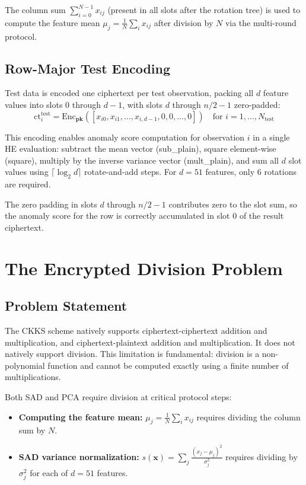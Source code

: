 The column sum $\sum_{i=0}^{N-1} x_{ij}$ (present in all slots after the
rotation tree) is used to compute the feature mean $\mu_j = \frac{1}{N}
\sum_i x_{ij}$ after division by $N$ via the multi-round protocol.

\subsection{Row-Major Test Encoding}

Test data is encoded one ciphertext per test observation, packing all $d$
feature values into slots $0$ through $d-1$, with slots $d$ through $n/2-1$
zero-padded:
\begin{equation}
  \mathrm{ct}_i^{\text{test}} = \mathrm{Enc}_\mathbf{pk}
  ([x_{i0}, x_{i1}, \ldots, x_{i,d-1}, 0, 0, \ldots, 0])
  \quad \text{for } i = 1, \ldots, N_\text{test}
  \label{eq:rowmajor}
\end{equation}

This encoding enables anomaly score computation for observation $i$ in a single
HE evaluation: subtract the mean vector (sub\_plain), square element-wise
(square), multiply by the inverse variance vector (mult\_plain), and sum all
$d$ slot values using $\lceil\log_2 d\rceil$ rotate-and-add steps. For
$d = 51$ features, only 6 rotations are required.

The zero padding in slots $d$ through $n/2-1$ contributes zero to the slot
sum, so the anomaly score for the row is correctly accumulated in slot 0 of
the result ciphertext.

\section{The Encrypted Division Problem}

\subsection{Problem Statement}

The CKKS scheme natively supports ciphertext-ciphertext addition and
multiplication, and ciphertext-plaintext addition and multiplication. It does
not natively support division. This limitation is fundamental: division is
a non-polynomial function and cannot be computed exactly using a finite number
of multiplications.

Both SAD and PCA require division at critical protocol steps:
\begin{itemize}
  \item \textbf{Computing the feature mean:} $\mu_j = \frac{1}{N} \sum_i
  x_{ij}$ requires dividing the column sum by $N$.
  \item \textbf{SAD variance normalization:} $s(\mathbf{x}) = \sum_j
  \frac{(x_j-\mu_j)^2}{\sigma_j^2}$ requires dividing by $\sigma_j^2$ for each
  of $d = 51$ features.
\end{itemize}

